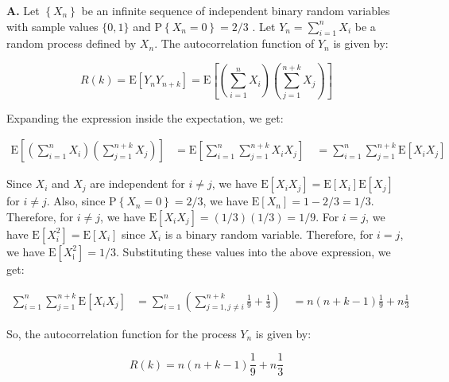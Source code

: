 \documentclass[main.tex]{subfiles}
\begin{document}
\begin{enumerate}
\begin{enumerate}
        \textbf{A.} Let $\left\{X_n\right\}$ be an infinite sequence of independent binary random variables with sample values $\{0,1\}$ and $\mathrm{P}\left\{X_n=0\right\}=2 / 3$ . Let $Y_n=\sum_{i=1}^n X_i$ be a random process defined by $X_n$. The autocorrelation function of $Y_n$ is given by:
        
        $$
        R(k)=\mathrm{E}\left[Y_n Y_{n+k}\right]=\mathrm{E}\left[\left(\sum_{i=1}^n X_i\right)\left(\sum_{j=1}^{n+k} X_j\right)\right]
        $$
        
        Expanding the expression inside the expectation, we get: 

        $$
        \begin{aligned} \mathrm{E}\left[\left(\sum_{i=1}^n X_i\right)\left(\sum_{j=1}^{n+k} X_j\right)\right] &= \mathrm{E}\left[\sum_{i=1}^n \sum_{j=1}^{n+k} X_iX_j\right] \ &= \sum_{i=1}^n \sum_{j=1}^{n+k} \mathrm{E}[X_iX_j] 
        \end{aligned}
        $$

        Since $X_i$ and $X_j$ are independent for $i \neq j$, we have $\mathrm{E}\left[X_i X_j\right]=\mathrm{E}\left[X_i\right] \mathrm{E}\left[X_j\right]$ for $i \neq j$. Also, since $\mathrm{P}\left\{X_n=0\right\}=2 / 3$, we have $\mathrm{E}\left[X_n\right]=1-2 / 3=1 / 3$. Therefore, for $i \neq j$, we have $\mathrm{E}\left[X_i X_j\right]=(1 / 3)(1 / 3)=1 / 9$. For $i=j$, we have $\mathrm{E}\left[X_i^2\right]=\mathrm{E}\left[X_i\right]$ since $X_i$ is a binary random variable. Therefore, for $i=j$, we have $\mathrm{E}\left[X_{\mathrm{i}}^2\right]=1 / 3$.
        Substituting these values into the above expression, we get: 

        $$
        \begin{align} \sum_{i=1}^n \sum_{j=1}^{n+k} \mathrm{E}[X_iX_j] &= \sum_{i=1}^n \left(\sum_{j=1, j\neq i}^{n+k} \frac{1}{9} + \frac{1}{3}\right) \ &= n(n+k-1)\frac{1}{9} + n\frac{1}{3} 
        \end{align}
        $$
        
        So, the autocorrelation function for the process $Y_n$ is given by:
        
        $$
        R(k)=n(n+k-1) \frac{1}{9}+n \frac{1}{3}
        $$
        
    \end{enumerate}
    
\end{enumerate}
\end{document}
